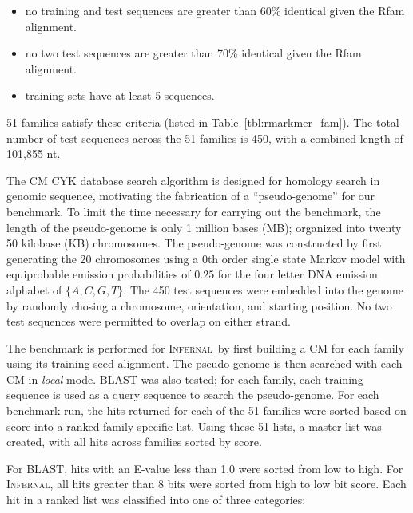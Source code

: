 \documentclass[11pt]{article}
\def\infernal{\textsc{Infernal}~}
\begin{document}
\begin{itemize}
\item
no training and test sequences are greater than 60\% identical given
the Rfam alignment.
\item
no two test sequences are greater than 70\% identical given the Rfam
alignment.
\item
training sets have at least 5 sequences.
\end{itemize}

51 families satisfy these criteria (listed in
Table~\ref{tbl:rmarkmer_fam}). The total number of test sequences
across the 51 families is 450, with a combined length of 101,855 nt. 

The CM CYK database search algorithm is designed for homology search in
genomic sequence, motivating the fabrication of a
``pseudo-genome'' for our benchmark. To limit the time
necessary for carrying out the benchmark, the length of the
pseudo-genome is only 1 million bases (MB); organized into twenty 50
kilobase (KB) chromosomes.
The pseudo-genome was constructed by first
generating the 20 chromosomes using a 0th order single state Markov
model with equiprobable emission probabilities of $0.25$ for the four
letter DNA emission alphabet of $\{A,C,G,T\}$.
The 450 test sequences were embedded into the genome by
randomly chosing a chromosome, orientation, and starting
position. No two test sequences were permitted to overlap on either strand.

The benchmark is performed for \infernal by
first building a CM for each family using its training seed alignment.
The pseudo-genome is then searched with each CM in \emph{local}
mode\@. \textsc{BLAST} was also tested; for each family, each training
sequence is used as a query sequence to search the pseudo-genome.
For each benchmark run, the hits returned for each of the 51
families were sorted based on score into a ranked family specific
list. Using these 51 lists, a master list was created, with all hits
across families sorted by score. 

For \textsc{BLAST}, hits with an E-value
less than 1.0 were sorted from low to high. For
\textsc{Infernal}, all hits greater than 8 bits were sorted from high to low
bit score.  Each hit in a ranked list was classified into one of
three categories:
\end{document}
